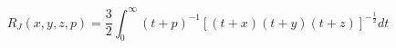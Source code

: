\documentclass[12pt]{article}
\begin{document}
\begin{displaymath}
R_J(x, y, z, p) = \frac{3}{2} \int_{0}^{\infty} (t+p)^{-1} [(t+x)(t+y)(t+z)]^{-\frac{1}{2}} dt
\end{displaymath}
\end{document}
